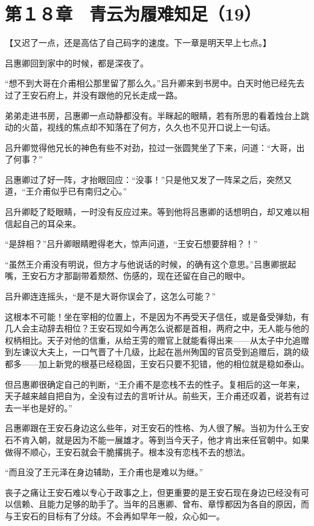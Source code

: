 \section{第１８章　青云为履难知足（19）}

【又迟了一点，还是高估了自己码字的速度。下一章是明天早上七点。】

吕惠卿回到家中的时候，都是深夜了。

“想不到大哥在介甫相公那里留了那么久。”吕升卿来到书房中。白天时他已经先去过了王安石府上，并没有跟他的兄长走成一路。

弟弟走进书房，吕惠卿一点动静都没有。半眯起的眼睛，若有所思的看着烛台上跳动的火苗，视线的焦点却不知落在了何方，久久也不见开口说上一句话。

吕升卿觉得他兄长的神色有些不对劲，拉过一张圆凳坐了下来，问道：“大哥，出了何事？”

吕惠卿过了好一阵，才抬眼回应：“没事！”只是他又发了一阵呆之后，突然又道，“王介甫似乎已有南归之心。”

吕升卿眨了眨眼睛，一时没有反应过来。等到他将吕惠卿的话想明白，却又难以相信起自己的耳朵来。

“是辞相？”吕升卿眼睛瞪得老大，惊声问道，“王安石想要辞相？！”

“虽然王介甫没有明说，但方才与他说话的时候，的确有这个意思。”吕惠卿抿起嘴，王安石方才那副带着颓然、伤感的，现在还留在自己的眼中。

吕升卿连连摇头，“是不是大哥你误会了，这怎么可能？”

这根本不可能！坐在宰相的位置上，不是因为不再受天子信任，或是备受弹劾，有几人会主动辞去相位？王安石现如今再怎么说都是首相，两府之中，无人能与他的权柄相比。天子对他的信重，从给王雱的赠官上就能看得出来——从太子中允追赠到左谏议大夫上，一口气晋了十几级，比起在邕州殉国的官员受到追赠后，跳的级都多——加上新党的根基已经稳固，王安石只要不犯错，他的相位就是稳如泰山。

但吕惠卿很确定自己的判断，“王介甫不是恋栈不去的性子。复相后的这一年来，天子越来越自把自为，全没有过去的言听计从。前些天，王介甫还叹着，说若有过去一半也是好的。”

吕惠卿跟在王安石身边这么些年，对王安石的性格、为人很了解。当初为什么王安石不肯入朝，就是因为不能一展雄才。等到当今天子，他才肯出来任官朝中。如果做得不顺心，王安石就会干脆撂挑子。根本没有恋栈不去的想法。

“而且没了王元泽在身边辅助，王介甫也是难以为继。”

丧子之痛让王安石难以专心于政事之上，但更重要的是王安石现在身边已经没有可以信赖、且能力足够的助手了。当年的吕惠卿、曾布、章惇都因为各自的原因，而与王安石的目标有了分歧。不会再如早年一般，众心如一。

